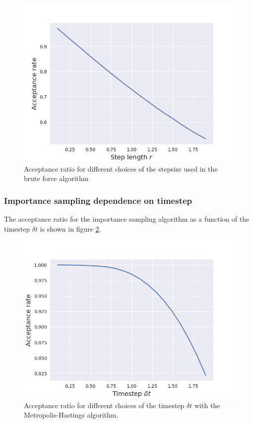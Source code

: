 \documentclass[norsk,a4paper,12pt]{article}
\begin{document}
\begin{figure} [H]
	\centering
	\includegraphics[scale=0.65]{images/acceptance_BF.png}
	\caption{Acceptance ratio for different choices of the stepsize used in the brute force algorithm}
	\label{fig:acceptance_BF_stepsize}
\end{figure} 

\subsubsection{Importance sampling dependence on timestep}
The acceptance ratio for the importance sampling algorithm as a function of the timestep $\delta t$ is shown in figure \ref{fig:acceptance_IS_timestep}. 

\begin{figure} [H]
	\centering
	\includegraphics[scale=0.65]{images/acceptance_IS.png}
	\caption{Acceptance ratio for different choices of the timestep $\delta t$  with the Metropolis-Hastings algorithm.}
	\label{fig:acceptance_IS_timestep}
\end{figure} 
\end{document}
